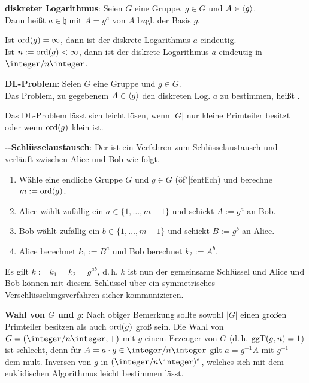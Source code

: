 \linie

\textbf{diskreter Logarithmus}:
Seien $G$ eine Gruppe, $g \in G$ und $A \in \langle g\rangle$.\\
Dann heißt $a \in \natural$ mit $A = g^a$  von $A$ bzgl. der
Basis $g$.

Ist $\operatorname{ord}(g) = \infty$, dann ist der diskrete Logarithmus $a$ eindeutig.\\
Ist $n := \operatorname{ord}(g) < \infty$, dann ist der diskrete Logarithmus $a$ eindeutig in $\ZnZ$.

\textbf{DL-Problem}:
Seien $G$ eine Gruppe und $g \in G$.\\
Das Problem, zu gegebenem $A \in \langle g\rangle$ den diskreten Log. $a$ zu bestimmen,
heißt .

Das DL-Problem lässt sich leicht lösen,
wenn $|G|$ nur kleine Primteiler besitzt oder wenn $\operatorname{ord}(g)$ klein ist.

\linie

\textbf{--Schlüsselaustausch}:
Der  ist ein Verfahren zum
Schlüsselaustausch und verläuft zwischen Alice und Bob wie folgt.
\begin{enumerate}
    \item
    Wähle eine endliche Gruppe $G$ und $g \in G$ (öf"|fentlich) und berechne $m := \operatorname{ord}(g)$.
    
    \item
    Alice wählt zufällig ein $a \in \{1, \dotsc, m - 1\}$ und schickt $A := g^a$ an Bob.
    
    \item
    Bob wählt zufällig ein $b \in \{1, \dotsc, m - 1\}$ und schickt $B := g^b$ an Alice.
    
    \item
    Alice berechnet $k_1 := B^a$ und Bob berechnet $k_2 := A^b$.
\end{enumerate}
Es gilt $k := k_1 = k_2 = g^{ab}$, d.\,h. $k$ ist nun der gemeinsame Schlüssel und Alice und Bob
können mit diesem Schlüssel über ein symmetrisches Verschlüsselungsverfahren sicher kommunizieren.

\linie

\textbf{Wahl von $G$ und $g$}:
Nach obiger Bemerkung sollte sowohl $|G|$ einen großen Primteiler besitzen als auch
$\operatorname{ord}(g)$ groß sein.
Die Wahl von $G = (\ZnZ, +)$ mit $g$ einem Erzeuger von $G$
(d.\,h. $\operatorname{ggT}(g, n) = 1$) ist schlecht, denn für
$A = a \cdot g \in \ZnZ$ gilt $a = g^{-1} A$ mit $g^{-1}$ dem mult. Inversen
von $g$ in $(\ZnZ)^\ast$, welches sich mit dem euklidischen Algorithmus leicht bestimmen lässt.

